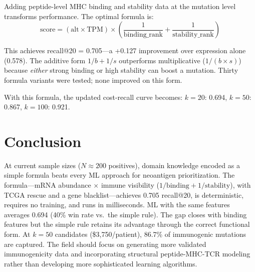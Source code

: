 \documentclass[11pt,twocolumn]{article}
\begin{document}
Adding peptide-level MHC binding and stability data at the mutation level
transforms performance. The optimal formula is:
\[
\text{score} = (\text{alt} \times \text{TPM}) \times
\left(\frac{1}{\text{binding\_rank}} + \frac{1}{\text{stability\_rank}}\right)
\]

This achieves recall@20 = 0.705---a +0.127 improvement over expression alone
(0.578). The additive form $1/b + 1/s$ outperforms multiplicative ($1/(b \times s)$)
because \textit{either} strong binding or high stability can boost a mutation.
Thirty formula variants were tested; none improved on this form.

With this formula, the updated cost-recall curve becomes:
$k=20$: 0.694, $k=50$: 0.867, $k=100$: 0.921.

\section{Conclusion}

At current sample sizes ($N \approx 200$ positives), domain knowledge
encoded as a simple formula beats every ML approach for neoantigen
prioritization. The formula---mRNA abundance $\times$ immune visibility
($1/\text{binding} + 1/\text{stability}$), with TCGA rescue and a gene
blacklist---achieves 0.705 recall@20, is deterministic, requires no
training, and runs in milliseconds. ML with the same features averages
0.694 (40\% win rate vs.\ the simple rule). The gap closes with binding
features but the simple rule retains its advantage through the correct
functional form. At $k=50$ candidates (\$3,750/patient), 86.7\% of
immunogenic mutations are captured. The field should focus on generating
more validated immunogenicity data and incorporating structural
peptide-MHC-TCR modeling rather than developing more sophisticated
learning algorithms.
\end{document}
